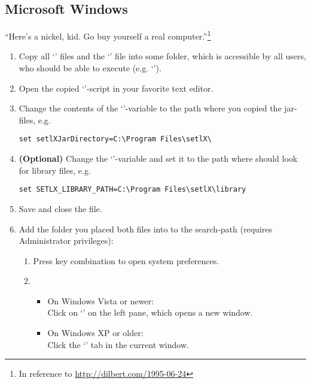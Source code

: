 \subsection{Microsoft Windows}

\begin{center}
\large
``Here's a nickel, kid. Go buy yourself a real computer.''\footnote{In reference to \url{http://dilbert.com/1995-06-24}}
\end{center}

\begin{enumerate}
	\item Copy all `' files and the `' file into some folder, which is accessible by all users, who should be able to execute \setlX{} (e.g. `').
	\item Open the copied `'-script in your favorite text editor.
	\item Change the contents of the `'-variable to the path where you copied the jar-files, e.g.
\begin{lstlisting}[frame=none,numbers=none]
set setlXJarDirectory=C:\Program Files\setlX\
\end{lstlisting}
	\item \textbf{(Optional)} Change the `'-variable and set it to the path where \setlX{} should look for library files, e.g.
\begin{lstlisting}[frame=none,numbers=none]
set SETLX_LIBRARY_PATH=C:\Program Files\setlX\library
\end{lstlisting}
	\item Save and close the file.
	\item Add the folder you placed both files into to the search-path (requires Administrator privileges):
	\begin{enumerate}
		\item Press \command{[Win]+[Pause]} key combination to open system preferences.
		\item 
		\begin{itemize}
			\item On Windows Vista or newer:\\Click on `' on the left pane, which opens a new window.
			\item On Windows XP or older:\\Click the `\command{Advanced}' tab in the current window.

\end{itemize}
\end{enumerate}
\end{enumerate}
